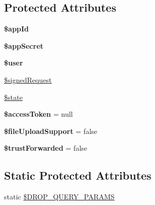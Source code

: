 \subsection*{Protected Attributes}
\begin{DoxyCompactItemize}
\item 
\hypertarget{classBaseFacebook_aa74008ce774d3376823e590fe369adf4}{{\bfseries \$app\-Id}}\label{classBaseFacebook_aa74008ce774d3376823e590fe369adf4}

\item 
\hypertarget{classBaseFacebook_af30d8846ad63ea8ca4c793f739dc70d3}{{\bfseries \$app\-Secret}}\label{classBaseFacebook_af30d8846ad63ea8ca4c793f739dc70d3}

\item 
\hypertarget{classBaseFacebook_a3db38309d6b663c38ec162c5f407e96a}{{\bfseries \$user}}\label{classBaseFacebook_a3db38309d6b663c38ec162c5f407e96a}

\item 
\hyperlink{classBaseFacebook_a90c6ec44757d540ffe1539f512af7469}{\$signed\-Request}
\item 
\hyperlink{classBaseFacebook_a8c3903cc0e9a12c87dfae721648491a2}{\$state}
\item 
\hypertarget{classBaseFacebook_ac2d8605e06b743693a58baccdcdfc300}{{\bfseries \$access\-Token} = null}\label{classBaseFacebook_ac2d8605e06b743693a58baccdcdfc300}

\item 
\hypertarget{classBaseFacebook_a9ea5d52eb0f9a31676155bf5b22517ad}{{\bfseries \$file\-Upload\-Support} = false}\label{classBaseFacebook_a9ea5d52eb0f9a31676155bf5b22517ad}

\item 
\hypertarget{classBaseFacebook_afd1c201d6088d9175379ad78b88444e0}{{\bfseries \$trust\-Forwarded} = false}\label{classBaseFacebook_afd1c201d6088d9175379ad78b88444e0}

\end{DoxyCompactItemize}
\subsection*{Static Protected Attributes}
\begin{DoxyCompactItemize}
\item 
static \hyperlink{classBaseFacebook_a463779b23fc993650d18af395979501d}{\$\-D\-R\-O\-P\-\_\-\-Q\-U\-E\-R\-Y\-\_\-\-P\-A\-R\-A\-M\-S}
\end{DoxyCompactItemize}


